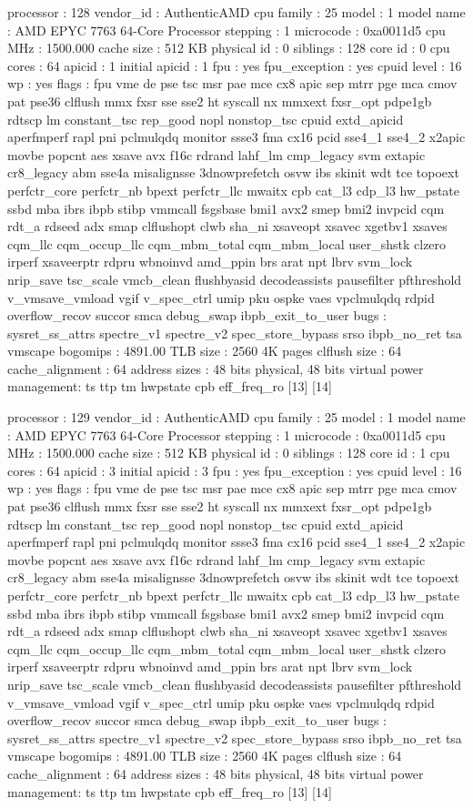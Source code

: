 processor	: 128
vendor_id	: AuthenticAMD
cpu family	: 25
model		: 1
model name	: AMD EPYC 7763 64-Core Processor
stepping	: 1
microcode	: 0xa0011d5
cpu MHz		: 1500.000
cache size	: 512 KB
physical id	: 0
siblings	: 128
core id		: 0
cpu cores	: 64
apicid		: 1
initial apicid	: 1
fpu		: yes
fpu_exception	: yes
cpuid level	: 16
wp		: yes
flags		: fpu vme de pse tsc msr pae mce cx8 apic sep mtrr pge mca cmov pat pse36 clflush mmx fxsr sse sse2 ht syscall nx mmxext fxsr_opt pdpe1gb rdtscp lm constant_tsc rep_good nopl nonstop_tsc cpuid extd_apicid aperfmperf rapl pni pclmulqdq monitor ssse3 fma cx16 pcid sse4_1 sse4_2 x2apic movbe popcnt aes xsave avx f16c rdrand lahf_lm cmp_legacy svm extapic cr8_legacy abm sse4a misalignsse 3dnowprefetch osvw ibs skinit wdt tce topoext perfctr_core perfctr_nb bpext perfctr_llc mwaitx cpb cat_l3 cdp_l3 hw_pstate ssbd mba ibrs ibpb stibp vmmcall fsgsbase bmi1 avx2 smep bmi2 invpcid cqm rdt_a rdseed adx smap clflushopt clwb sha_ni xsaveopt xsavec xgetbv1 xsaves cqm_llc cqm_occup_llc cqm_mbm_total cqm_mbm_local user_shstk clzero irperf xsaveerptr rdpru wbnoinvd amd_ppin brs arat npt lbrv svm_lock nrip_save tsc_scale vmcb_clean flushbyasid decodeassists pausefilter pfthreshold v_vmsave_vmload vgif v_spec_ctrl umip pku ospke vaes vpclmulqdq rdpid overflow_recov succor smca debug_swap ibpb_exit_to_user
bugs		: sysret_ss_attrs spectre_v1 spectre_v2 spec_store_bypass srso ibpb_no_ret tsa vmscape
bogomips	: 4891.00
TLB size	: 2560 4K pages
clflush size	: 64
cache_alignment	: 64
address sizes	: 48 bits physical, 48 bits virtual
power management: ts ttp tm hwpstate cpb eff_freq_ro [13] [14]

processor	: 129
vendor_id	: AuthenticAMD
cpu family	: 25
model		: 1
model name	: AMD EPYC 7763 64-Core Processor
stepping	: 1
microcode	: 0xa0011d5
cpu MHz		: 1500.000
cache size	: 512 KB
physical id	: 0
siblings	: 128
core id		: 1
cpu cores	: 64
apicid		: 3
initial apicid	: 3
fpu		: yes
fpu_exception	: yes
cpuid level	: 16
wp		: yes
flags		: fpu vme de pse tsc msr pae mce cx8 apic sep mtrr pge mca cmov pat pse36 clflush mmx fxsr sse sse2 ht syscall nx mmxext fxsr_opt pdpe1gb rdtscp lm constant_tsc rep_good nopl nonstop_tsc cpuid extd_apicid aperfmperf rapl pni pclmulqdq monitor ssse3 fma cx16 pcid sse4_1 sse4_2 x2apic movbe popcnt aes xsave avx f16c rdrand lahf_lm cmp_legacy svm extapic cr8_legacy abm sse4a misalignsse 3dnowprefetch osvw ibs skinit wdt tce topoext perfctr_core perfctr_nb bpext perfctr_llc mwaitx cpb cat_l3 cdp_l3 hw_pstate ssbd mba ibrs ibpb stibp vmmcall fsgsbase bmi1 avx2 smep bmi2 invpcid cqm rdt_a rdseed adx smap clflushopt clwb sha_ni xsaveopt xsavec xgetbv1 xsaves cqm_llc cqm_occup_llc cqm_mbm_total cqm_mbm_local user_shstk clzero irperf xsaveerptr rdpru wbnoinvd amd_ppin brs arat npt lbrv svm_lock nrip_save tsc_scale vmcb_clean flushbyasid decodeassists pausefilter pfthreshold v_vmsave_vmload vgif v_spec_ctrl umip pku ospke vaes vpclmulqdq rdpid overflow_recov succor smca debug_swap ibpb_exit_to_user
bugs		: sysret_ss_attrs spectre_v1 spectre_v2 spec_store_bypass srso ibpb_no_ret tsa vmscape
bogomips	: 4891.00
TLB size	: 2560 4K pages
clflush size	: 64
cache_alignment	: 64
address sizes	: 48 bits physical, 48 bits virtual
power management: ts ttp tm hwpstate cpb eff_freq_ro [13] [14]

